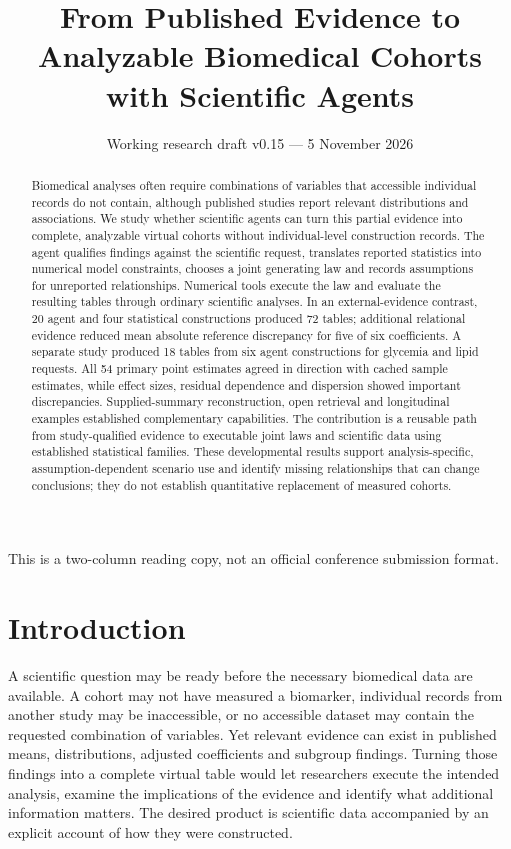 \documentclass[10pt,twocolumn]{article}
\title{From Published Evidence to Analyzable Biomedical Cohorts with Scientific Agents}
\author{\small Working research draft v0.15 --- 5 November 2026}
\date{}
\begin{document}
\maketitle
\begingroup\footnotesize\noindent This is a two-column reading copy, not an official conference submission format.\par\endgroup
\begin{abstract}

Biomedical analyses often require combinations of variables that accessible individual records do not contain, although published studies report relevant distributions and associations. We study whether scientific agents can turn this partial evidence into complete, analyzable virtual cohorts without individual-level construction records. The agent qualifies findings against the scientific request, translates reported statistics into numerical model constraints, chooses a joint generating law and records assumptions for unreported relationships. Numerical tools execute the law and evaluate the resulting tables through ordinary scientific analyses. In an external-evidence contrast, 20 agent and four statistical constructions produced 72 tables; additional relational evidence reduced mean absolute reference discrepancy for five of six coefficients. A separate study produced 18 tables from six agent constructions for glycemia and lipid requests. All 54 primary point estimates agreed in direction with cached sample estimates, while effect sizes, residual dependence and dispersion showed important discrepancies. Supplied-summary reconstruction, open retrieval and longitudinal examples established complementary capabilities. The contribution is a reusable path from study-qualified evidence to executable joint laws and scientific data using established statistical families. These developmental results support analysis-specific, assumption-dependent scenario use and identify missing relationships that can change conclusions; they do not establish quantitative replacement of measured cohorts.

\end{abstract}

\section{Introduction}

A scientific question may be ready before the necessary biomedical data are available. A cohort may not have measured a biomarker, individual records from another study may be inaccessible, or no accessible dataset may contain the requested combination of variables. Yet relevant evidence can exist in published means, distributions, adjusted coefficients and subgroup findings. Turning those findings into a complete virtual table would let researchers execute the intended analysis, examine the implications of the evidence and identify what additional information matters. The desired product is scientific data accompanied by an explicit account of how they were constructed.
\end{document}
